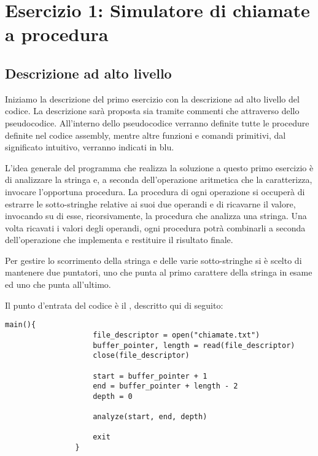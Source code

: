 \section*{Esercizio 1: Simulatore di chiamate a procedura}

	\subsection*{Descrizione ad alto livello}
	
		Iniziamo la descrizione del primo esercizio con la descrizione ad alto livello del codice. La descrizione sarà proposta sia tramite commenti che attraverso dello pseudocodice. All'interno dello pseudocodice verranno definite tutte le procedure definite nel codice assembly, mentre altre funzioni e comandi primitivi, dal significato intuitivo, verranno indicati in blu.
		
		L'idea generale del programma che realizza la soluzione a questo primo esercizio è di analizzare la stringa e, a seconda dell'operazione aritmetica che la caratterizza, invocare l'opportuna procedura. La procedura di ogni operazione si occuperà di estrarre le sotto-stringhe relative ai suoi due operandi e di ricavarne il valore, invocando su di esse, ricorsivamente, la procedura che analizza una stringa. Una volta ricavati i valori degli operandi, ogni procedura potrà combinarli a seconda dell'operazione che implementa e restituire il risultato finale.
		
		Per gestire lo scorrimento della stringa e delle varie sotto-stringhe si è scelto di mantenere due puntatori, uno che punta al primo carattere della stringa in esame ed uno che punta all'ultimo.
		
		Il punto d'entrata del codice è il , descritto qui di seguito:
		
        \begin{center}
           	\begin{lstlisting}[language=pseudo, gobble=14]
                main(){
                    file_descriptor = open("chiamate.txt")
                    buffer_pointer, length = read(file_descriptor)
                    close(file_descriptor)
    	           	
                    start = buffer_pointer + 1
                    end = buffer_pointer + length - 2
                    depth = 0
    	           	
                    analyze(start, end, depth)
    	           	
                    exit
                }
           	\end{lstlisting}
        \end{center}
        
